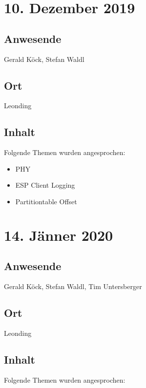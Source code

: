\pagebreak

\section*{10. Dezember 2019}

\subsection*{Anwesende}

Gerald Köck, Stefan Waldl

\subsection*{Ort}

Leonding

\subsection*{Inhalt}

Folgende Themen wurden angesprochen:

\begin{itemize}
  \item PHY
  \item ESP Client Logging
  \item Partitiontable Offset
\end{itemize}

\pagebreak

\section*{14. Jänner 2020}

\subsection*{Anwesende}

Gerald Köck, Stefan Waldl, Tim Untersberger

\subsection*{Ort}

Leonding

\subsection*{Inhalt}

Folgende Themen wurden angesprochen:

